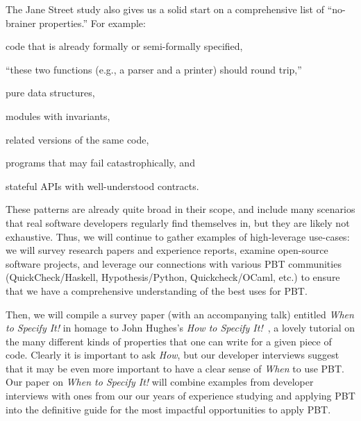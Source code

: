The Jane Street study also gives us a solid start on a comprehensive list of
``no-brainer properties.''  For example:
\begin{enumerate*}[label=(1)]
\item code that is already formally or semi-formally specified,
\item ``these two functions (e.g., a parser and a printer) should round trip,''
\item pure data structures,
\item modules with invariants,
\item related versions of the same code,
\item programs that may fail catastrophically,
and
\item stateful APIs with well-understood contracts.
\end{enumerate*}
These patterns are already quite broad in their scope, and include many
scenarios that real software developers regularly find themselves in, but they
are likely not exhaustive. Thus, we will continue to gather examples of
high-leverage use-cases: we will survey research papers and experience reports,
examine open-source software projects, and leverage our connections with various
PBT communities (QuickCheck/Haskell, Hypothesis/Python, Quickcheck/OCaml, etc.)
to ensure that we have a comprehensive understanding of the best uses for PBT.

Then,
we will compile a survey paper
(with an accompanying talk)
entitled {\em When to Specify It!} in homage to
John Hughes's {\em How to Specify It!}~\cite{HowToSpecifyIt}, a lovely
tutorial on the many different kinds of properties that one can write
for a given piece
of code. Clearly it is important to ask {\em How}, but our developer interviews
suggest that it may be even more important to have a clear sense of {\em When}
to use PBT. Our paper on {\em When to Specify It!} will combine examples from developer
interviews with ones from our our years of experience studying and applying PBT
into the definitive guide for the most impactful opportunities to apply PBT.


 

